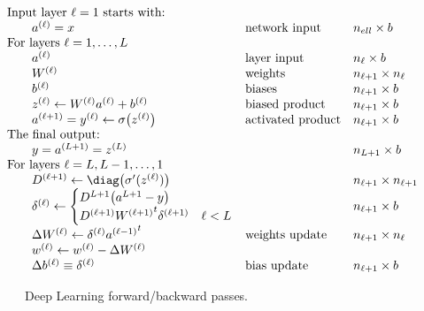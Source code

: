 \begin{figure}[t]
  \def\header#1{\multicolumn{3}{l}{ \kern-20pt \hbox{#1}}}
  \begin{equation}
    \begin{array}{lll}
      \header{Input layer $\ell=1$ starts with:}\\
      a\supell=x&\textrm{network input}&n_{ell}\times b\\
      \header{For layers $\ell=1,\ldots,L$}\\
      a\supell&\textrm{layer input}&n_\ell\times b\\
      W\supell&\textrm{weights}&n_{\ell+1}\times n_\ell\\
      b\supell&\textrm{biases}&n_{\ell+1}\times b\\
      z\supell \leftarrow W\supell a\supell + b\supell
      &\textrm{biased product}&n_{\ell+1}\times b\\
      a\supellp=y\supell\leftarrow \sigma\bigl( z\supell \bigr)
      &\textrm{activated product}&n_{\ell+1}\times b\\
      \header{The final output:}\\
      y=a^{(L+1)}=z^{(L)}&&n_{L+1}\times b\\
      \header{For layers $\ell=L,L-1,\ldots,1$}\\
      D\supellp \leftarrow \diag\bigl( \sigma'(z\supell) \bigr)
      &&n_{\ell+1}\times n_{\ell+1}\\
      \delta\supell \leftarrow
      \begin{cases}
        D^{L+1}\bigl( a^{L+1}-y \bigr)\\
        D\supellp {W\supellp}^t \delta\supellp&\ell<L
      \end{cases}
      &&n_{\ell+1}\times b\\
      \Delta W\supell \leftarrow \delta\supell {a\supellm}^t
      &\textrm{weights update}&n_{\ell+1}\times n_\ell\\
      w\supell \leftarrow w\supell - \Delta W\supell
      &&\\
      \Delta b\supell \equiv \delta\supell
      &\textrm{bias update}&n_{\ell+1}\times b\\
    \end{array}
  \end{equation}
  \caption{Deep Learning forward/backward passes.}
  \label{fig:dl-algorithm}
\end{figure}

